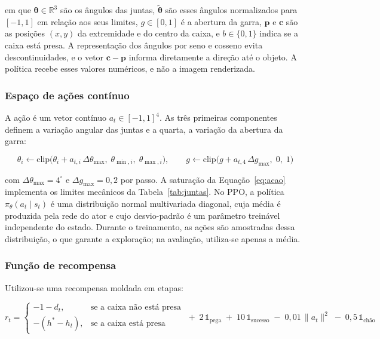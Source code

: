 \noindent em que $\boldsymbol{\theta} \in \mathbb{R}^3$ são os ângulos das juntas, $\tilde{\boldsymbol{\theta}}$ são esses ângulos normalizados para $[-1, 1]$ em relação aos seus limites, $g \in [0, 1]$ é a abertura da garra, $\mathbf{p}$ e $\mathbf{c}$ são as posições $(x, y)$ da extremidade e do centro da caixa, e $b \in \{0, 1\}$ indica se a caixa está presa. A representação dos ângulos por seno e cosseno evita descontinuidades, e o vetor $\mathbf{c} - \mathbf{p}$ informa diretamente a direção até o objeto. A política recebe esses valores numéricos, e não a imagem renderizada.

\subsubsection{Espaço de ações contínuo}

A ação é um vetor contínuo $a_t \in [-1, 1]^4$. As três primeiras componentes definem a variação angular das juntas e a quarta, a variação da abertura da garra:

\begin{equation}
    \theta_i \leftarrow \text{clip}\big(\theta_i + a_{t,i}\,\Delta\theta_{\max},\; \theta_{\min,i},\; \theta_{\max,i}\big),
    \qquad
    g \leftarrow \text{clip}\big(g + a_{t,4}\,\Delta g_{\max},\; 0,\; 1\big)
    \label{eq:acao}
\end{equation}

\noindent com $\Delta\theta_{\max} = 4^\circ$ e $\Delta g_{\max} = 0{,}2$ por passo. A saturação da Equação~\ref{eq:acao} implementa os limites mecânicos da Tabela~\ref{tab:juntas}. No PPO, a política $\pi_\theta(a_t \mid s_t)$ é uma distribuição normal multivariada diagonal, cuja média é produzida pela rede do ator e cujo desvio-padrão é um parâmetro treinável independente do estado. Durante o treinamento, as ações são amostradas dessa distribuição, o que garante a exploração; na avaliação, utiliza-se apenas a média.

\subsubsection{Função de recompensa}

Utilizou-se uma recompensa moldada em etapas:

\begin{equation}
    r_t =
    \begin{cases}
        -1 - d_t, & \text{se a caixa não está presa} \\
        -(h^{*} - h_t), & \text{se a caixa está presa}
    \end{cases}
    \; + \; 2\,\mathbb{1}_{\text{pega}} \; + \; 10\,\mathbb{1}_{\text{sucesso}} \; - \; 0{,}01\,\lVert a_t \rVert^2 \; - \; 0{,}5\,\mathbb{1}_{\text{chão}}
    \label{eq:recompensa}
\end{equation}

